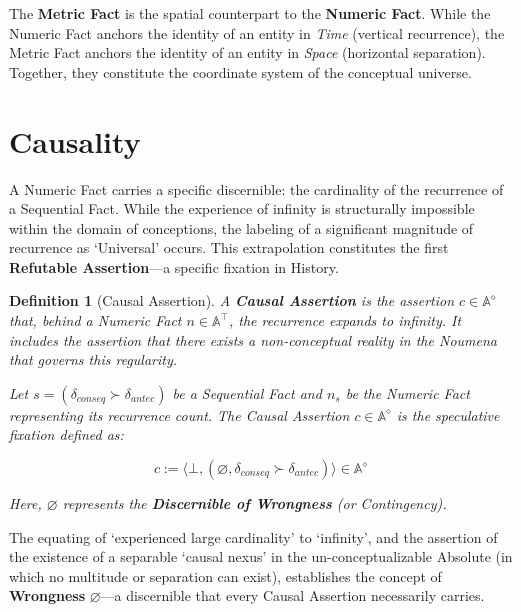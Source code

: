 \documentclass[11pt, a4paper]{article}
\theoremstyle{formalism}
\newtheorem{formalism}{Definition}
\begin{document}
The \textbf{Metric Fact} is the spatial counterpart to the \textbf{Numeric Fact}. While the Numeric Fact anchors the identity of an entity in \textit{Time} (vertical recurrence), the Metric Fact anchors the identity of an entity in \textit{Space} (horizontal separation). Together, they constitute the coordinate system of the conceptual universe.

\section{Causality}

A Numeric Fact carries a specific discernible: the cardinality of the recurrence of a Sequential Fact. While the experience of infinity is structurally impossible within the domain of conceptions, the labeling of a significant magnitude of recurrence as `Universal' occurs. This extrapolation constitutes the first \textbf{Refutable Assertion}---a specific fixation in History.

\begin{formalism}[Causal Assertion]

    A \textbf{Causal Assertion} is the assertion $c \in \mathbb{A}^\diamond$ that, behind a Numeric Fact $n \in \mathbb{A}^\top$, the recurrence expands to infinity. It includes the assertion that there exists a non-conceptual reality in the Noumena that governs this regularity.

    Let $s = (\delta_{conseq} \succ \delta_{antec})$ be a Sequential Fact and $n_s$ be the Numeric Fact representing its recurrence count. The Causal Assertion $c \in \mathbb{A}^\diamond$ is the speculative fixation defined as:

    \begin{equation}
        c := \langle \bot, (\varnothing, \delta_{conseq} \succ \delta_{antec}) \rangle \in \mathbb{A}^\diamond
    \end{equation}

    Here, $\varnothing$ represents the \textbf{Discernible of Wrongness} (or Contingency).

\end{formalism}

The equating of `experienced large cardinality' to `infinity', and the assertion of the existence of a separable `causal nexus' in the un-conceptualizable Absolute (in which no multitude or separation can exist), establishes the concept of \textbf{Wrongness} $\varnothing$---a discernible that every Causal Assertion necessarily carries.
\end{document}
